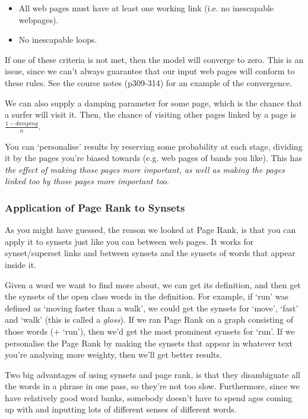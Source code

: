\begin{itemize}
  \item All web pages must have at least one working link (i.e. no inescapable
    webpages).
  \item No inescapable loops.
\end{itemize}

If one of these criteria is not met, then the model will converge to zero. This
is an issue, since we can't always guarantee that our input web pages will
conform to these rules. See the course notes (p309-314) for an example of the
convergence.

We can also supply a damping parameter for some page, which is the chance that a
surfer will visit it. Then, the chance of visiting other pages linked by a page
is $\frac{1 - damping}{n}$.

You can `personalise' results by reserving some probability at each stage,
dividing it by the pages you're biased towards (e.g. web pages of bands you
like). This has \textit{the effect of making those pages more important, as well
as making the pages linked too by those pages more important too}.

\subsubsection{Application of Page Rank to Synsets}

As you might have guessed, the reason we looked at Page Rank, is that you can
apply it to synsets just like you can between web pages. It works for
synset/superset links and between synsets and the synsets of words that appear
inside it.

Given a word we want to find more about, we can get its definition, and then get
the synsets of the open class words in the definition. For example, if `run' was
defined as `moving faster than a walk', we could get the synsets for `move',
`fast' and `walk' (this is called a \textit{gloss}). If we ran Page Rank on a
graph consisting of those words (+ `run'), then we'd get the most prominent
synsets for `run'. If we personalise the Page Rank by making the synsets that
appear in whatever text you're analysing more weighty, then we'll get better
results.

Two big advantages of using synsets and page rank, is that they disambiguate all
the words in a phrase in one pass, so they're not too slow. Furthermore, since
we have relatively good word banks, somebody doesn't have to spend ages coming
up with and inputting lots of different senses of different words.

